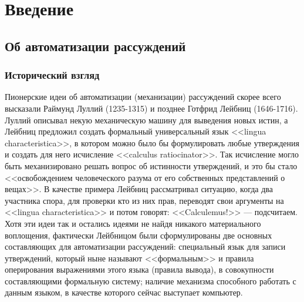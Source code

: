\chapter{Введение}


\section{Об автоматизации рассуждений}
\subsection{Исторический взгляд}
Пионерские идеи об автоматизации (механизации) рассуждений скорее всего высказали Раймунд Луллий (1235-1315) и позднее Готфрид Лейбниц (1646-1716). Луллий описывал некую механическую машину для выведения новых истин, а Лейбниц предложил создать формальный универсальный язык <<lingua characteristica>>, в котором можно было бы формулировать любые утверждения и создать для него исчисление <<calculus ratiocinator>>. Так исчисление могло быть механизировано решать вопрос об истинности утверждений, и это бы стало <<освобождением человеческого разума от его собственных представлений о вещах>>. В качестве примера Лейбниц рассматривал ситуацию, когда два участника спора, для проверки кто из них прав, переводят свои аргументы на <<lingua characteristica>> и потом говорят: <<Calculemus!>> --- подсчитаем. Хотя эти идеи так и остались идеями не найдя никакого материального воплощения, фактически Лейбницом были сформулированы две основных составляющих для автоматизации рассуждений: специальный язык для записи утверждений, который ныне называют <<формальным>> и правила оперирования выражениями этого языка (правила вывода), в совокупности составляющими формальную систему; наличие механизма способного работать с данным языком, в качестве которого сейчас выступает компьютер.


